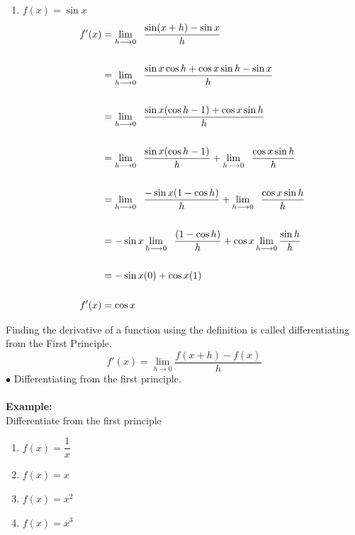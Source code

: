 \documentclass[11pt,a4paper]{article}
\begin{document}
\begin{enumerate}
\item[(ii).] $f(x)=\sin x$
\begin{align*}
f'(x) & = \lim_{h \longrightarrow 0} \hspace{0.2cm} \frac{\sin (x+h)-\sin x}{h}\\\\
& = \lim_{h \longrightarrow 0}\hspace{0.2cm} \frac{\sin x\cos h+\cos x\sin h-\sin x}{h}\\\\
& = \lim_{h \longrightarrow 0}\hspace{0.2cm}\frac{\sin x(\cos h -1)+\cos x\sin h}{h}\\\\
& = \lim_{h \longrightarrow 0}\hspace{0.2cm} \frac{\sin x (\cos h-1)}{h} + \lim_{h \longrightarrow 0} \hspace{0.2cm} \frac{\cos x \sin h}{h}\\\\
& = \lim_{h \longrightarrow 0}\hspace{0.2cm}\frac{- \sin x (1-\cos h)}{h} + \lim_{h \longrightarrow 0} \hspace{0.2cm}\frac{\cos x \sin h}{h}\\\\
& = -\sin x \lim_{h \longrightarrow 0}\hspace{0.2cm} \frac{(1-\cos h)}{h}+ \cos x \lim_{h \longrightarrow 0} \frac{\sin h}{h}\\\\
& = -\sin x (0) + \cos x (1)\\\\
f'(x) &=\cos x\\
\end{align*}
\end{enumerate}




Finding the derivative of a function using the definition is called differentiating from the First Principle. $$f'(x)=\lim _{h \longrightarrow 0} \frac{f(x+h)-f(x)}{h}$$ 
$\bullet$ Differentiating from the first principle.\\\\

\textbf{Example:}\\
Differentiate from the first principle
\begin{enumerate}
\item $f(x)=\dfrac{1}{x}$
\item $f(x)=x$
\item $f(x)=x^2$
\item $f(x)=x^3$\\
\end{enumerate}
\end{document}

